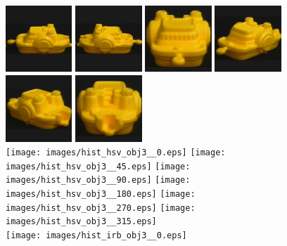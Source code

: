 \begin{figure}[tbp]
\begin{center}
\includegraphics[width=2.5cm]{coil/beeld-12.eps}
\includegraphics[width=2.5cm]{coil/beeld-13.eps}
\includegraphics[width=2.5cm]{coil/beeld-14.eps}
\includegraphics[width=2.5cm]{coil/beeld-15.eps}
\includegraphics[width=2.5cm]{coil/beeld-16.eps}
\includegraphics[width=2.5cm]{coil/beeld-17.eps}\\[5pt]
\texttt{[image: images/hist\_hsv\_obj3\_\_0.eps]}
\texttt{[image: images/hist\_hsv\_obj3\_\_45.eps]}
\texttt{[image: images/hist\_hsv\_obj3\_\_90.eps]}
\texttt{[image: images/hist\_hsv\_obj3\_\_180.eps]}
\texttt{[image: images/hist\_hsv\_obj3\_\_270.eps]}
\texttt{[image: images/hist\_hsv\_obj3\_\_315.eps]}\\[5pt]
\texttt{[image: images/hist\_irb\_obj3\_\_0.eps]}

\end{center}
\end{figure}
